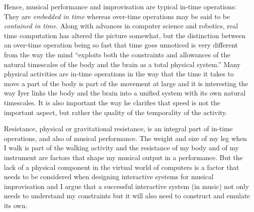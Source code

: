 \documentclass{article}
\begin{document}
Hence, musical performance and improvisation are typical in-time operations: They are \emph{embedded in time} whereas over-time operations may be said to be \emph{contained in time}. Along with advances in computer science and robotics, real time computation has altered the picture somewhat, but the distinction between an over-time operation being so fast that time goes unnoticed is very different from the way the mind ``exploits both the constraints and allowances of the natural timescales of the body and the brain as a total physical system.'' \citep[276]{iyer08} Many physical activities are in-time operations in the way that the time it takes to move a part of the body is part of the movement at large and it is interesting the way Iyer links the body and the brain into a unified system with its own natural timescales. It is also important the way he clarifies that speed is not the important aspect, but rather the quality of the temporality of the activity. 

Resistance, physical or gravitational resistance, is an integral part of in-time operations, and also of musical performance. The weight and size of my leg when I walk is part of the walking activity and the resistance of my body and of my instrument are factors that shape my musical output in a performance. But the lack of a physical component in the virtual world of computers is a factor that needs to be considered when designing interactive systems for musical improvisation and I argue that a successful interactive system (in music) not only needs to understand my constraints but it will also need to construct and emulate its own.



\end{document}
